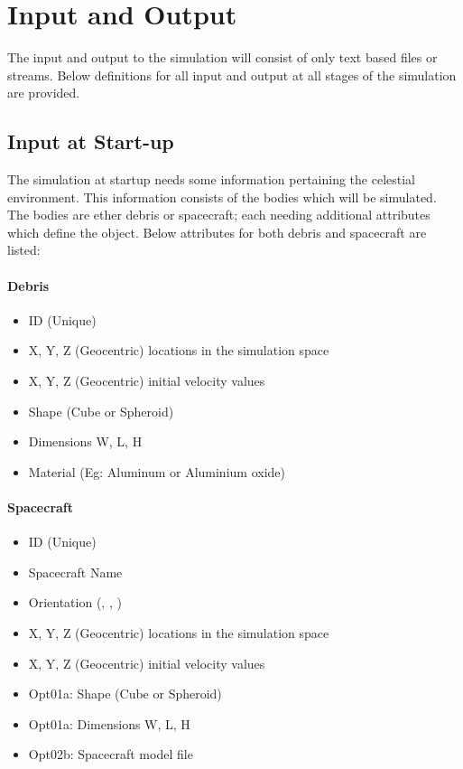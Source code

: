 \documentclass{article}
\begin{document}
  \section{Input and Output}
  
The input and output to the simulation will consist of only text based files or streams. Below definitions for all input and output at all stages of the simulation are provided. 
  
  \subsection{Input at Start-up}
  
  The simulation at startup needs some information pertaining the celestial environment. This information consists of the bodies which will be simulated. The bodies are ether debris or spacecraft; each needing additional attributes which define the object. Below attributes for both debris and spacecraft are listed:
  
  \paragraph{Debris}
  \begin{itemize}
  	\item ID (Unique)
  	\item X, Y, Z (Geocentric) locations in the simulation space
  	\item X, Y, Z (Geocentric) initial velocity values
  	\item Shape (Cube or Spheroid)
  	\item Dimensions W, L, H
  	\item Material (Eg: Aluminum or Aluminium oxide)
  \end{itemize}
  
  \paragraph{Spacecraft}
  \begin{itemize}
    	\item ID (Unique)
    	\item Spacecraft Name
    	\item Orientation (\textalpha, \textbeta, \textgamma)
  	\item X, Y, Z (Geocentric) locations in the simulation space
  	\item X, Y, Z (Geocentric) initial velocity values
  	\item Opt01a: Shape (Cube or Spheroid)
  	\item Opt01a: Dimensions W, L, H
  	\item Opt02b: Spacecraft model file
  \end{itemize}
  
\end{document}
